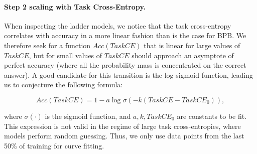 


\paragraph{Step 2 scaling with Task Cross-Entropy.} When inspecting the ladder models, we notice that the task cross-entropy correlates with accuracy in a more linear fashion than is the case for BPB.
We therefore seek for a function $Acc(TaskCE)$ that is linear for large values of $TaskCE$, but for small values of $TaskCE$ should approach an asymptote of perfect accuracy (where all the probability mass is concentrated on the correct answer). 
A good candidate for this transition is the log-sigmoid function, leading us to conjecture the following formula:

\begin{equation} \label{eqn:log_sigmoid}
Acc(TaskCE) = 1 - a\log \sigma\left(-k (TaskCE - TaskCE_0)\right),
\end{equation}

where $\sigma(\cdot)$ is the sigmoid function, and $a, k, TaskCE_0$ are constants to be fit.
This expression is not valid in the regime of large task cross-entropies, where models perform random guessing. Thus, we only use data points from the last 50\% of training for curve fitting.



